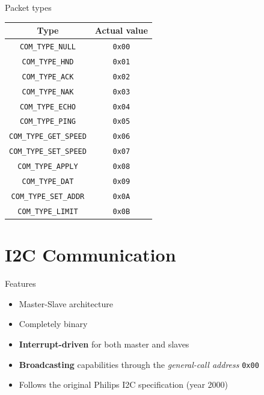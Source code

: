 \documentclass{beamer}
\begin{document}
\begin{frame}{Packet types}
\begin{longtable}[]{@{}cc@{}}
\toprule
  Type & Actual value \\
\midrule
\endhead
  \texttt{COM\_TYPE\_NULL} & \texttt{0x00} \\
  \texttt{COM\_TYPE\_HND} & \texttt{0x01} \\
  \texttt{COM\_TYPE\_ACK} & \texttt{0x02} \\
  \texttt{COM\_TYPE\_NAK} & \texttt{0x03} \\
  \texttt{COM\_TYPE\_ECHO} & \texttt{0x04} \\
  \texttt{COM\_TYPE\_PING} & \texttt{0x05} \\
  \texttt{COM\_TYPE\_GET\_SPEED} & \texttt{0x06} \\
  \texttt{COM\_TYPE\_SET\_SPEED} & \texttt{0x07} \\
  \texttt{COM\_TYPE\_APPLY} & \texttt{0x08} \\
  \texttt{COM\_TYPE\_DAT} & \texttt{0x09} \\
  \texttt{COM\_TYPE\_SET\_ADDR} & \texttt{0x0A} \\
  \texttt{COM\_TYPE\_LIMIT} & \texttt{0x0B} \\
\bottomrule
\end{longtable}
\end{frame}

\hypertarget{i2c-communication}{%
\section{I2C Communication}\label{i2c-communication}}

\begin{frame}{Features}
\begin{itemize}
  \item Master-Slave architecture
  \item Completely binary
  \item \textbf{Interrupt-driven} for both master and slaves
  \item \textbf{Broadcasting} capabilities through the \emph{general-call
    address} \texttt{0x00}
  \item Follows the original Philips I2C specification (year 2000)
\end{itemize}
\end{frame}
\end{document}
